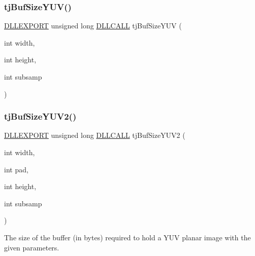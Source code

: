 \mbox{\label{group___turbo_j_p_e_g_ga9d0cb06fd5052d21b6f2b382db8b219c}} 
\subsubsection{\texorpdfstring{tj\+Buf\+Size\+Y\+U\+V()}{tjBufSizeYUV()}}
{\footnotesize\ttfamily \hyperlink{turbojpeg_8h_a808e08638be3cba36e36759e5b150de0}{D\+L\+L\+E\+X\+P\+O\+RT} unsigned long \hyperlink{turbojpeg_8h_a54b25836118bfac94a53a7b790f3ccb2}{D\+L\+L\+C\+A\+LL} tj\+Buf\+Size\+Y\+UV (\begin{DoxyParamCaption}\item[{int}]{width,  }\item[{int}]{height,  }\item[{int}]{subsamp }\end{DoxyParamCaption})}

\mbox{\label{group___turbo_j_p_e_g_gaf451664a62c1f6c7cc5a6401f32908c9}} 
\subsubsection{\texorpdfstring{tj\+Buf\+Size\+Y\+U\+V2()}{tjBufSizeYUV2()}}
{\footnotesize\ttfamily \hyperlink{turbojpeg_8h_a808e08638be3cba36e36759e5b150de0}{D\+L\+L\+E\+X\+P\+O\+RT} unsigned long \hyperlink{turbojpeg_8h_a54b25836118bfac94a53a7b790f3ccb2}{D\+L\+L\+C\+A\+LL} tj\+Buf\+Size\+Y\+U\+V2 (\begin{DoxyParamCaption}\item[{int}]{width,  }\item[{int}]{pad,  }\item[{int}]{height,  }\item[{int}]{subsamp }\end{DoxyParamCaption})}

The size of the buffer (in bytes) required to hold a Y\+UV planar image with the given parameters.


